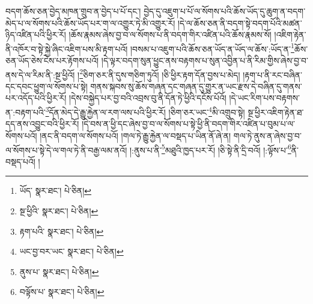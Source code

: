 བདག་ཆོས་ཅན་བྱེད་མཁན་གྲུབ་ན་བྱེད་པ་པོ་དང་། བྱེད་དུ་འཇུག་པ་པོ་ལ་སོགས་པའི་ཆོས་ཡོད་དུ་ཆུག་ན་བདག་མེད་པ་ལ་སོགས་པའི་ཆོས་ཡོད་པར་ག་ལ་འགྱུར་ཏེ་མི་འགྱུར་རོ། །དེ་ལ་ཆོས་ཅན་ནི་བདག་སྟེ་བདག་པོའི་མཚན་ཉིད་འཛིན་པའི་ཕྱིར་རོ། །ཆོས་རྣམས་ཞེས་བྱ་བ་ལ་སོགས་པ་ནི་བདག་གིར་འཛིན་པའི་ཆོས་རྣམས་སོ། །འཇིག་རྟེན་ནི་འཁོར་བ་སྟེ་སྐྱེ་ཞིང་འཇིག་པས་མི་རྟག་པའོ། །བསམ་པ་འཇུག་པའི་ཆོས་ཅན་ཡོད་ན་ཡོད་ལ་ཆོས་:ཡོད་ན་\footnote{ཡོད་  སྣར་ཐང་།  པེ་ཅིན། }ཆོས་ཅན་ཡོད་ཅེས་ངེས་པར་རྟོགས་པའོ། །དེ་ལྟར་བདག་སུན་ཕྱུང་ནས་བརྟགས་པ་སུན་འབྱིན་པ་ནི་རིམ་གྱིས་ཞེས་བྱ་བ་ནས་དེ་ལ་རིམ་ནི་:སྔ་ཕྱིའོ། །\footnote{སྔ་ཕྱིའི་  སྣར་ཐང་།  པེ་ཅིན། }ཅིག་ཅར་ནི་དུས་གཅིག་ཏུའོ། །ཅི་ཕྱིར་རྟག་དོན་བྱས་པ་མེད། །རྟག་པ་ནི་རང་བཞིན་དང་དབང་ཕྱུག་ལ་སོགས་པ་སྟེ། གནས་སྐབས་སུ་ཆོས་གཞན་དང་གཞན་དུ་གྱུར་ན་ཡང་རྫས་དེ་བཞིན་དུ་གནས་པར་འདོད་པའི་ཕྱིར་རོ། །དེས་བསྐྱེད་པར་བྱ་བའི་འབྲས་བུ་ནི་དོན་ཏེ་ཕྱིའི་དངོས་པོའོ། །དེ་ཡང་རིག་པས་བརྟགས་ན་:བརྟག་པའི་\footnote{རྟག་པའི་  སྣར་ཐང་།  པེ་ཅིན། }དོན་མེད་དེ་རྒྱུ་རྐྱེན་ལ་རག་ལས་པའི་ཕྱིར་རོ། །ཅིག་ཅར་ཡང་\footnote{ཡང་བྱ་བར་ཡང་  སྣར་ཐང་།  པེ་ཅིན། }མི་འགྲུབ་སྟེ། སྔ་ཕྱིར་འཇིག་རྟེན་ཐ་དད་ནས་འབྱུང་བའི་ཕྱིར་རོ། །དེ་བས་ན་ཕྱི་དང་ཞེས་བྱ་བ་ལ་སོགས་པ་སྟེ་ཕྱི་ནི་བདག་གིར་འཛིན་པ་བུམ་པ་ལ་སོགས་པའོ། །ནང་ནི་བདག་ལ་སོགས་པའོ། །གལ་ཏེ་རྒྱུ་རྐྱེན་ལ་བསྡད་པ་ཡིན་ནོ་ཞེ་ན། གལ་ཏེ་ནུས་ན་ཞེས་བྱ་བ་ལ་སོགས་པ་སྟེ་དེ་ལ་གལ་ཏེ་ནི་བརྒྱ་ལམ་ནའོ། །:ནུས་པ་ནི་\footnote{ནུས་པ་  སྣར་ཐང་།  པེ་ཅིན། }མཐུའི་ཁྱད་པར་རོ། །ཅི་སྟེ་ནི་དྲི་བའོ། །:ལྟོས་པ་\footnote{བལྟོས་པ་  སྣར་ཐང་།  པེ་ཅིན། }ནི་བསྡད་པའོ། །
